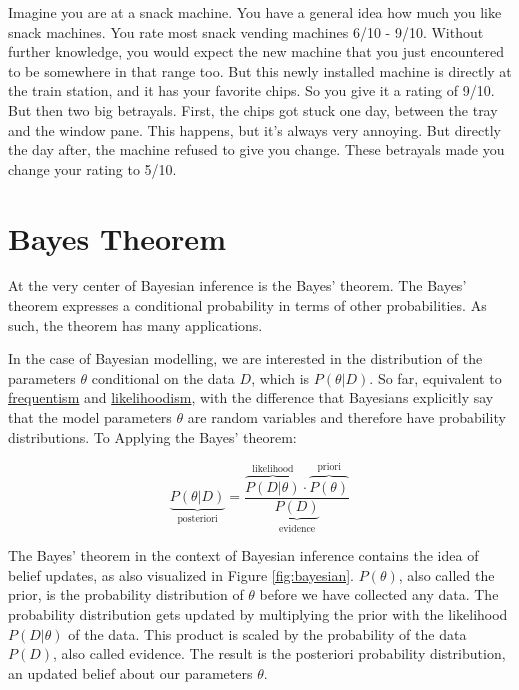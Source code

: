 \documentclass[
  10pt,
]{scrbook}
\begin{document}
Imagine you are at a snack machine.
You have a general idea how much you like snack machines.
You rate most snack vending machines 6/10 - 9/10.
Without further knowledge, you would expect the new machine that you just encountered to be somewhere in that range too.
But this newly installed machine is directly at the train station, and it has your favorite chips.
So you give it a rating of 9/10.
But then two big betrayals.
First, the chips got stuck one day, between the tray and the window pane.
This happens, but it's always very annoying.
But directly the day after, the machine refused to give you change.
These betrayals made you change your rating to 5/10.

\hypertarget{bayes-theorem}{%
\section{Bayes Theorem}\label{bayes-theorem}}

At the very center of Bayesian inference is the Bayes' theorem.
The Bayes' theorem expresses a conditional probability in terms of other probabilities.
As such, the theorem has many applications.

In the case of Bayesian modelling, we are interested in the distribution of the parameters \(\theta\) conditional on the data \(D\), which is \(P(\theta | D)\).
So far, equivalent to \protect\hyperlink{frequentism}{frequentism} and \protect\hyperlink{likelihoodism}{likelihoodism}, with the difference that Bayesians explicitly say that the model parameters \(\theta\) are random variables and therefore have probability distributions.
To
Applying the Bayes' theorem:

\[\underbrace{P(\theta|D)}_{\text{posteriori}} = \frac{\overbrace{P(D | \theta)}^{\text{likelihood}} \cdot  \overbrace{P(\theta)}^{\text{priori}}}{\underbrace{P(D)}_{\text{evidence}}}\]

The Bayes' theorem in the context of Bayesian inference contains the idea of belief updates, as also visualized in Figure \ref{fig:bayesian}.
\(P(\theta)\), also called the prior, is the probability distribution of \(\theta\) before we have collected any data.
The probability distribution gets updated by multiplying the prior with the likelihood \(P(D | \theta)\) of the data.
This product is scaled by the probability of the data \(P(D)\), also called evidence.
The result is the posteriori probability distribution, an updated belief about our parameters \(\theta\).
\end{document}
